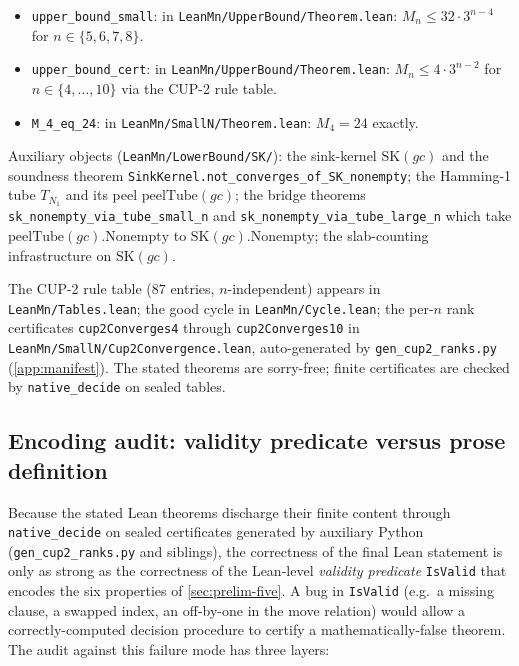\documentclass[11pt,a4paper]{article}
\theoremstyle{plain}
\theoremstyle{definition}
\newcommand{\Mn}{M_n}
\newcommand{\SK}{\mathrm{SK}}
\newcommand{\peelTube}{\mathrm{peelTube}}
\begin{document}
\begin{itemize}[leftmargin=*]
\item \texttt{upper\_bound\_small}: in
\texttt{LeanMn/UpperBound/Theorem.lean}: $\Mn \le 32 \cdot 3^{n-4}$ for
$n \in \{5, 6, 7, 8\}$.
\item \texttt{upper\_bound\_cert}: in
\texttt{LeanMn/UpperBound/Theorem.lean}: $\Mn \le 4 \cdot 3^{n-2}$ for
$n \in \{4, \ldots, 10\}$ via the CUP-2 rule table.
\item \texttt{M\_4\_eq\_24}: in \texttt{LeanMn/SmallN/Theorem.lean}:
$M_4 = 24$ exactly.
\end{itemize}

Auxiliary objects (\texttt{LeanMn/LowerBound/SK/}): the sink-kernel
$\SK(gc)$ and the soundness theorem
\texttt{SinkKernel.not\_converges\_of\_SK\_nonempty}; the Hamming-1
tube $T_{N_1}$ and its peel $\peelTube(gc)$; the bridge theorems
\texttt{sk\_nonempty\_via\_tube\_small\_n} and
\texttt{sk\_nonempty\_via\_tube\_large\_n} which take
$\peelTube(gc).\mathrm{Nonempty}$ to $\SK(gc).\mathrm{Nonempty}$; the
slab-counting infrastructure on $\SK(gc)$.

The CUP-2 rule table ($87$ entries, $n$-independent) appears in
\texttt{LeanMn/Tables.lean}; the good cycle in \texttt{LeanMn/Cycle.lean};
the per-$n$ rank certificates \texttt{cup2Converges4} through
\texttt{cup2Converges10} in
\texttt{LeanMn/SmallN/Cup2Convergence.lean}, auto-generated by
\texttt{gen\_cup2\_ranks.py} (\cref{app:manifest}).  The stated
theorems are sorry-free; finite certificates are checked by
\texttt{native\_decide} on sealed tables.

\subsection{Encoding audit: validity predicate versus prose definition}\label{app:lean-encoding-audit}

Because the stated Lean theorems discharge their finite content
through \texttt{native\_decide} on sealed certificates generated by
auxiliary Python (\texttt{gen\_cup2\_ranks.py} and siblings), the
correctness of the final Lean statement is only as strong as the
correctness of the Lean-level \emph{validity predicate}
\texttt{IsValid} that encodes the six properties of
\cref{sec:prelim-five}.  A bug in \texttt{IsValid} (e.g.\ a
missing clause, a swapped index, an off-by-one in the move relation)
would allow a correctly-computed decision procedure to certify a
mathematically-false theorem.  The audit against this failure mode
has three layers:
\end{document}
